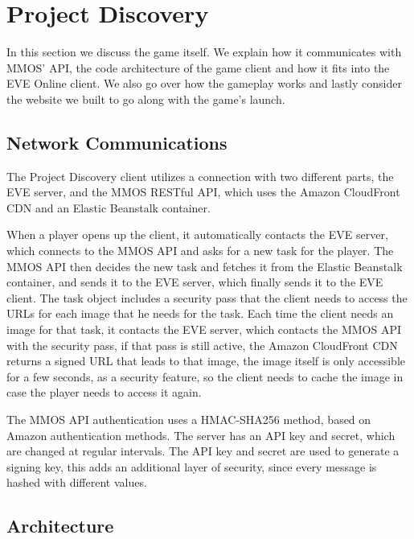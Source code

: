 \section{Project Discovery}\label{sec:projectdiscovery}

	In this section we discuss the game itself. We explain how it communicates with MMOS' API, the code architecture of the game client and how it fits into the EVE Online client. We also go over how the gameplay works and lastly consider the website we built to go along with the game's launch.

\subsection{Network Communications}
	The Project Discovery client utilizes a connection with two different parts, the EVE server, and the MMOS RESTful API, which uses the Amazon CloudFront CDN and an Elastic Beanstalk container.

	When a player opens up the client, it automatically contacts the EVE server, which connects to the MMOS API and asks for a new task for the player. The MMOS API then decides the new task and fetches it from the Elastic Beanstalk container, and sends it to the EVE server, which finally sends it to the EVE client. The task object includes a security pass that the client needs to access the URLs for each image that he needs for the task. Each time the client needs an image for that task, it contacts the EVE server, which contacts the MMOS API with the security pass, if that pass is still active, the Amazon CloudFront CDN returns a signed URL that leads to that image, the image itself is only accessible for a few seconds, as a security feature, so the client needs to cache the image in case the player needs to access it again.

	The MMOS API authentication uses a HMAC-SHA256 method, based on Amazon authentication methods. The server has an API key and secret, which are changed at regular intervals. The API key and secret are used to generate a signing key, this adds an additional layer of security, since every message is hashed with different values.

\subsection{Architecture}



